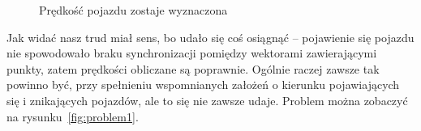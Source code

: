 \documentclass[11pt, a4paper]{article}
\begin{document}
\begin{figure}[htbp!]
	\caption{Prędkość pojazdu zostaje wyznaczona}
	\label{fig:poj}
\end{figure}

Jak widać nasz trud miał sens, bo udało się coś osiągnąć -- pojawienie się pojazdu nie spowodowało braku synchronizacji pomiędzy wektorami zawierającymi punkty, zatem prędkości obliczane są poprawnie. Ogólnie raczej zawsze tak powinno być, przy spełnieniu wspomnianych założeń o kierunku pojawiających się i znikających pojazdów, ale to się nie zawsze udaje. Problem można zobaczyć na rysunku~\ref{fig:problem1}.
\begin{figure}[htbp!]
	\centering
	
	\hfill%
\end{figure}
\end{document}
